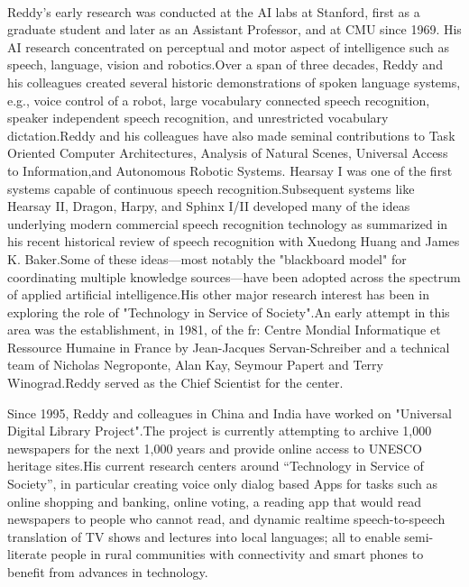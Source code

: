 \documentclass[a4paper,10pt]{article}
\begin{document}
\paragraph{}
  Reddy's early research was conducted at the AI labs at Stanford, first as 
  a graduate student and later as an Assistant Professor, and at CMU since 1969.
  His AI research concentrated on perceptual and motor aspect of intelligence 
  such as speech, language, vision and robotics.Over a span of three decades, 
  Reddy and his colleagues created several historic demonstrations of spoken 
  language systems, e.g., voice control of a robot, large vocabulary connected
  speech recognition, speaker independent speech recognition, and unrestricted 
  vocabulary dictation.Reddy and his colleagues have also made seminal 
  contributions to Task Oriented Computer Architectures, Analysis of Natural 
  Scenes, Universal Access to Information,and Autonomous Robotic Systems.
  Hearsay I was one of the first systems capable of continuous speech 
  recognition.Subsequent systems like Hearsay II, Dragon, Harpy, and 
  Sphinx I/II developed many of the ideas underlying modern commercial speech 
  recognition technology as summarized in his recent historical review of 
  speech recognition with Xuedong Huang and James K. Baker.Some of these 
  ideas—most notably the "blackboard model" for coordinating multiple knowledge
  sources—have been adopted across the spectrum of applied artificial 
  intelligence.His other major research interest has been in exploring the 
  role of "Technology in Service of Society".An early attempt in this area 
  was the establishment, in 1981, of the fr: Centre Mondial Informatique et 
  Ressource Humaine in France by Jean-Jacques Servan-Schreiber and a 
  technical team of Nicholas Negroponte, Alan Kay, Seymour Papert and 
  Terry Winograd.Reddy served as the Chief Scientist for the center.
  
  Since 1995, Reddy and colleagues in China and India have worked on 
  "Universal Digital Library Project".The project is currently attempting 
  to archive 1,000 newspapers for the next 1,000 years and provide online 
  access to UNESCO heritage sites.His current research centers around 
  “Technology in Service of Society”, in particular creating voice only 
  dialog based Apps for tasks such as online shopping and banking, online
  voting, a reading app that would read newspapers to people who cannot 
  read, and dynamic realtime speech-to-speech translation of TV shows and 
  lectures into local languages; all to enable semi-literate people in rural
  communities with connectivity and smart phones to benefit from advances in
  technology.
  
\end{document}
